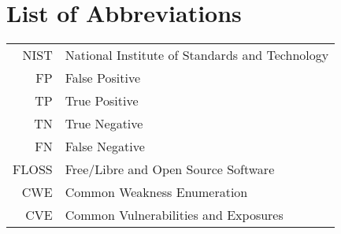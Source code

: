 \chapter*{List of Abbreviations}
\begin{tabular}{rl}
  NIST & National Institute of Standards and Technology \\
  FP & False Positive \\
  TP & True Positive \\
  TN & True Negative \\
  FN & False Negative \\
  FLOSS & Free/Libre and Open Source Software \\
  CWE & Common Weakness Enumeration \\
  CVE & Common Vulnerabilities and Exposures
\end{tabular}



\listoffigures

\listoftables

